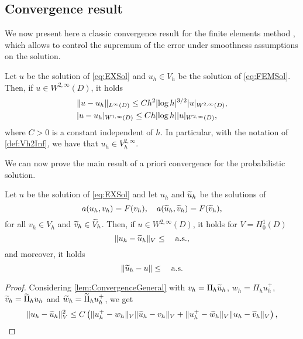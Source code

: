 \documentclass[10pt]{article}
\begin{document}
\subsection{Convergence result}

We now present here a classic convergence result for the finite elements method \cite[Theorem 3.3.7]{Cia02}, which allows to control the supremum of the error under smoothness assumptions on the solution.
\begin{theorem}\label{thm:CiarletUniform} Let $u$ be the solution of \eqref{eq:EXSol} and $u_h \in V_h$ be the solution of \eqref{eq:FEMSol}. Then, if $u \in W^{2, \infty}(D)$, it holds
	\begin{equation}\label{eq:W1InfErr}
	\begin{aligned}
	&\lVert u - u_h\rVert_{L^\infty(D)} \leq C h^2 \lvert\log h\rvert^{3/2} \lvert u\rvert_{W^{2, \infty}(D)}, \\
	&\lvert u - u_h\rvert_{W^{1, \infty}(D)} \leq C h \lvert\log h\rvert \lvert u\rvert_{W^{2, \infty}(D)},
	\end{aligned}
	\end{equation}
	where $C > 0$ is a constant independent of $h$. In particular, with the notation of \cref{def:Vh2Inf}, we have that $u_h \in V_h^{2, \infty}$.
\end{theorem}

We can now prove the main result of a priori convergence for the probabilistic solution.
\begin{theorem}\label{thm:APriori} Let $u$ be the solution of \eqref{eq:EXSol} and let $u_h$ and $\widetilde u_h$ be the solutions of
	\begin{equation}
		a(u_h, v_h) = F(v_h), \quad a(\widetilde u_h, \widetilde v_h) = F(\widetilde v_h),
	\end{equation}
	for all $v_h \in V_h$ and $\widetilde v_h \in \widetilde V_h$. Then, if $u \in W^{2, \infty}(D)$, it holds for $V = H^1_0(D)$
	\begin{equation}
		\lVert u_h - \widetilde u_h\rVert_V \leq \quad \text{a.s.},
	\end{equation}
	and moreover, it holds
	\begin{equation}
		\lVert\widetilde u_h - u\rVert \leq \quad \text{a.s.}
	\end{equation}
\end{theorem}
\begin{proof} Considering \cref{lem:ConvergenceGeneral} with $v_h = \Pi_h \widetilde u_h$, $w_h = \Pi_h u_h^+$, $\widetilde v_h = \widetilde \Pi_h u_h$ and $\widetilde w_h = \widetilde \Pi_h u_h^+$, we get
	\begin{equation}
		\lVert u_h - \widetilde u_h\rVert_V^2 \leq C \left(\lVert u_h^+ - w_h\rVert_V \lVert\widetilde u_h - v_h\rVert_V + \lVert u_h^+ - \widetilde w_h\rVert_V \lVert u_h - \widetilde v_h\rVert_V \right),
	\end{equation}
\end{proof}
\end{document}
